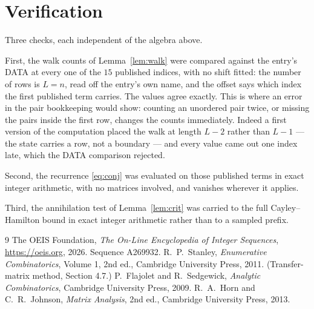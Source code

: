 \documentclass[11pt,a4paper]{article}
\theoremstyle{plain}
\theoremstyle{definition}
\begin{document}
\section{Verification}

Three checks, each independent of the algebra above.

First, the walk counts of Lemma~\ref{lem:walk} were compared against the entry's DATA at
every one of the $15$ published indices, with no shift fitted: the number of rows is
$L=n$, read off the entry's own name, and the offset says which index the first
published term carries. The values agree exactly. This is where an error in the pair
bookkeeping would show: counting an unordered pair twice, or missing the pairs inside the
first row, changes the counts immediately. Indeed a first version of the computation
placed the walk at length $L-2$ rather than $L-1$ --- the state carries a row, not a
boundary --- and every value came out one index late, which the DATA comparison rejected.

Second, the recurrence \eqref{eq:conj} was evaluated on those published terms in exact
integer arithmetic, with no matrices involved, and vanishes wherever it applies.

Third, the annihilation test of Lemma~\ref{lem:crit} was carried to the full
Cayley--Hamilton bound in exact integer arithmetic rather than to a sampled prefix.

\begin{thebibliography}{9}
 The OEIS Foundation, \emph{The On-Line Encyclopedia of Integer
Sequences}, \url{https://oeis.org}, 2026. Sequence A269932.
 R.~P.~Stanley, \emph{Enumerative Combinatorics}, Volume 1, 2nd ed.,
Cambridge University Press, 2011. (Transfer-matrix method, Section 4.7.)
 P.~Flajolet and R.~Sedgewick, \emph{Analytic Combinatorics}, Cambridge
University Press, 2009.
 R.~A.~Horn and C.~R.~Johnson, \emph{Matrix Analysis}, 2nd ed., Cambridge
University Press, 2013.
\end{thebibliography}
\end{document}
